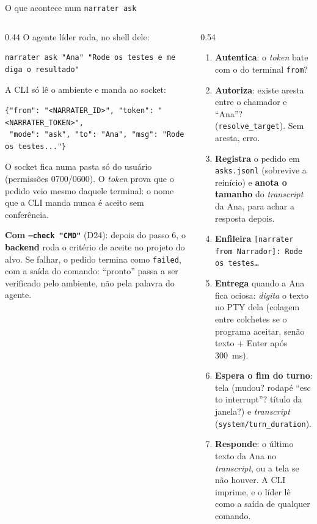 \documentclass[11pt,aspectratio=169]{beamer}
\begin{document}
\begin{frame}[fragile]{O que acontece num \texttt{narrater ask}}
\begin{columns}[T]
\begin{column}{0.44\linewidth}
\footnotesize
O agente líder roda, no shell dele:
\begin{lstlisting}[basicstyle=\ttfamily\tiny, breaklines=false]
narrater ask "Ana" "Rode os testes e me diga o resultado"
\end{lstlisting}
A CLI só lê o ambiente e manda ao socket:
\begin{lstlisting}[basicstyle=\ttfamily\tiny, breaklines=false]
{"from": "<NARRATER_ID>", "token": "<NARRATER_TOKEN>",
 "mode": "ask", "to": "Ana", "msg": "Rode os testes..."}
\end{lstlisting}
\vspace{0.2em}
{\scriptsize O socket fica numa pasta só do usuário (permissões 0700/0600). O \emph{token} prova que o pedido
veio mesmo daquele terminal: o nome que a CLI manda nunca é aceito sem conferência.}
\vspace{0.4em}

{\scriptsize\textbf{Com \texttt{--check "CMD"}} (D24): depois do passo 6, o \textbf{backend} roda o critério de aceite no
projeto do alvo. Se falhar, o pedido termina como \texttt{failed}, com a saída do comando: ``pronto'' passa a ser
verificado pelo ambiente, não pela palavra do agente.}
\end{column}
\begin{column}{0.54\linewidth}
\scriptsize
\begin{enumerate}\setlength\itemsep{0.25em}
\item \textbf{Autentica}: o \emph{token} bate com o do terminal \texttt{from}?
\item \textbf{Autoriza}: existe aresta entre o chamador e ``Ana''? (\texttt{resolve\_target}). Sem aresta, erro.
\item \textbf{Registra} o pedido em \texttt{asks.jsonl} (sobrevive a reinício) e \textbf{anota o tamanho} do
  \emph{transcript} da Ana, para achar a resposta depois.
\item \textbf{Enfileira} \texttt{[narrater from Narrador]: Rode os testes\dots}
\item \textbf{Entrega} quando a Ana fica ociosa: \emph{digita} o texto no PTY dela (colagem entre colchetes se o
  programa aceitar, senão texto + Enter após 300~ms).
\item \textbf{Espera o fim do turno}: tela (mudou? rodapé ``esc to interrupt''? título da janela?) e
  \emph{transcript} (\texttt{system/turn\_duration}).
\item \textbf{Responde}: o último texto da Ana no \emph{transcript}, ou a tela se não houver. A CLI imprime, e o
  líder lê como a saída de qualquer comando.
\end{enumerate}
\end{column}
\end{columns}
\end{frame}
\end{document}
